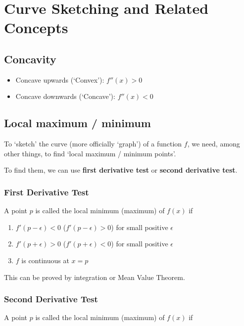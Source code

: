 \section{Curve Sketching and Related Concepts}

\subsection{Concavity}

\begin{itemize}
  \item Concave upwards (`Convex'): $f''(x) > 0$
  \item Concave downwards (`Concave'): $f''(x) < 0$
\end{itemize}

\subsection{Local maximum / minimum}

To `sketch' the curve (more officially `graph') of a function $f$, we need, among other things, to find `local maximum / minimum points'.

To find them, we can use \textbf{first derivative test} or \textbf{second derivative test}.

\subsubsection{First Derivative Test}

A point $p$ is called the local minimum (maximum) of $f(x)$ if

\begin{enumerate}
  \item $f'(p - \epsilon) < 0$ ($f'(p - \epsilon) > 0$) for small positive $\epsilon$
  \item $f'(p + \epsilon) > 0$ ($f'(p + \epsilon) < 0$) for small positive $\epsilon$
  \item $f$ is continuous at $x = p$
\end{enumerate}

This can be proved by integration or Mean Value Theorem.

\subsubsection{Second Derivative Test}

A point $p$ is called the local minimum (maximum) of $f(x)$ if

